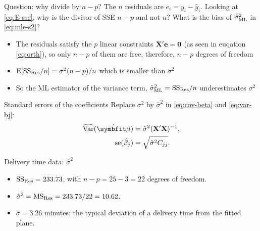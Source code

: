 \begin{frame}{Question: why divide by $n-p$?}
    The $n$ residuals are $e_i=y_i-\hat y_i$. Looking at \eqref{eq:E-sse}, why is the divisor of SSE $n-p$ and not $n$?
    What is the bias of $\hat\sigma^2_{\mathrm{ML}}$ in \eqref{eq:mle-s2}?

    \svspace{1em}

    \pause

    \begin{itemize}
        \item The residuals satisfy the $p$ linear constraints \(\mathbf{X}' \mathbf{e} = \mathbf{0}\) (as seen in euqation \ref{eq:orth}), so only $n-p$ of them are free, therefore, $n-p$ degrees of freedom
        \item \(\operatorname{E}[\mathrm{SS}_{\mathrm{Res}}/n] = \sigma^2 (n-p)/n\) which is smaller than \(\sigma^2\)
        \item So the ML estimator of the variance term, \(\hat{\sigma}^2_{\mathrm{ML}} = \mathrm{SS}_{\mathrm{Res}}/n\) underestimates \(\sigma^2\)
    \end{itemize}

\end{frame}


\begin{frame}{Standard errors of the coefficients}
    Replace $\sigma^2$ by $\hat\sigma^2$ in \eqref{eq:cov-beta} and \eqref{eq:var-bj}:
    \begin{align}
        \widehat{\Var}(\hat{\bbeta}) &= \hat\sigma^2(\bX'\bX)^{-1}, \notag\\
        \se(\hat\beta_j) &= \sqrt{\hat\sigma^2 C_{jj}}. \label{eq:se}
    \end{align}
\end{frame}


\begin{frame}{Delivery time data: $\hat\sigma^2$}
    \begin{itemize}
        \item $\mathrm{SS}_{\mathrm{Res}} = 233.73$, with $n-p = 25-3 = 22$ degrees of freedom.
        \item $\hat\sigma^2 = \mathrm{MS}_{\mathrm{Res}} = 233.73/22 = 10.62$.
        \item $\hat\sigma = 3.26$ minutes: the typical deviation of a delivery time from the fitted plane.
    \end{itemize}
\end{frame}


